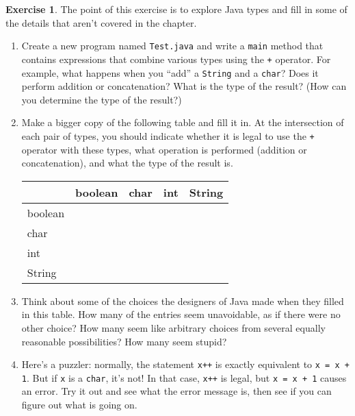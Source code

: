 \documentclass[12pt]{book}
\theoremstyle{definition}
\newtheorem{excz}{Exercise}[chapter]
\newenvironment{exercise}{\bigskip\begin{excz}\mbox{}}{\end{excz}}
\begin{document}
\begin{exercise}

The point of this exercise is to explore Java types
and fill in some of the details that aren't covered
in the chapter.

\begin{enumerate}

\item Create a new program named {\tt Test.java} and write
a {\tt main} method that contains
expressions that combine
various types using the {\tt +} operator.  For example, what
happens when you ``add'' a {\tt String} and a {\tt char}?
Does it perform addition or concatenation?   What is the type
of the result? (How can you determine the type of the result?)

\item Make a bigger copy of the following table and fill it in.  At the
intersection of each pair of types, you should indicate whether it is
legal to use the {\tt +} operator with these types, what operation is
performed (addition or concatenation), and what the type of the result
is.

\begin{tabular}{|l|l|l|l|l|} \hline
        &  boolean  &  char  &  int  &  String \\ \hline
boolean &           &        &       &         \\ \hline
char    &           &        &       &         \\ \hline
int     &           &        &       &         \\ \hline
String  &           &        &       &         \\ \hline
\end{tabular}

\item Think about some of the choices the designers of Java
made when they filled in this table.  How many of the entries
seem unavoidable, as if there were no other choice?
How many seem like arbitrary choices from several equally
reasonable possibilities?  How many seem stupid?

\item Here's a puzzler: normally, the statement {\tt x++} is exactly
  equivalent to {\tt x = x + 1}.  But if {\tt x} is a {\tt char}, it's
  not!  In that case, {\tt x++} is legal, but {\tt x = x + 1} causes
  an error.  Try it out and see what the error message is, then see if
  you can figure out what is going on.

\end{enumerate}
\end{exercise}
\end{document}
